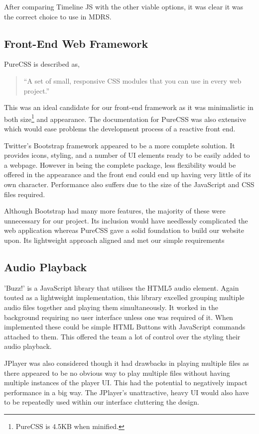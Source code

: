 \documentclass{l3proj}
\begin{document}
After comparing Timeline JS with the other viable options, it was clear it was the correct choice to use in MDRS.

\subsection{Front-End Web Framework}

PureCSS\cite{pureCSS} is described as,

\blockquote{“A set of small, responsive CSS modules that you can use in every web project.”}

This was an ideal candidate for our front-end framework as it was minimalistic in both size\footnote{PureCSS is 4.5KB when minified.} and appearance. The documentation for PureCSS was also extensive which would  ease problems the development process of a reactive front end.

Twitter's Bootstrap framework appeared to be a more complete solution. It provides icons, styling, and a number of UI elements ready to be easily added to a webpage. However in being the complete package, less flexibility would be offered in the appearance and the front end could end up having very little of its own character. Performance also suffers due to the size of the \gls{JavaScript} and CSS files required.

Although Bootstrap\cite{bootstrap} had many more features, the majority of these were unnecessary for our project. Its inclusion would have needlessly complicated the web application whereas PureCSS gave a solid foundation to build our website upon. Its lightweight approach aligned and met our simple requirements


\subsection{Audio Playback}

'Buzz!'\cite{buzz} is a \gls{JavaScript} library that utilises the HTML5 audio element. Again touted as a lightweight implementation, this library excelled grouping multiple audio files together and playing them simultaneously. It worked in the background requiring no user interface unless one was required of it. When implemented these could be simple \gls{HTML} Buttons with JavaScript commands attached to them. This offered the team a lot of control over the styling their audio playback.

JPlayer\cite{JPlayer} was also considered though it had drawbacks in playing multiple files as there appeared to be no obvious way to play multiple files without having multiple instances of the player UI. This had the potential to negatively impact performance in a big way. The JPlayer's unattractive, heavy UI would also have to be repeatedly used within our interface cluttering the design.
\end{document}
